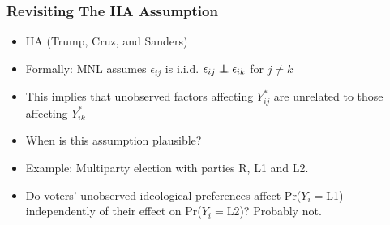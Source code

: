 \documentclass{beamer}
\newcommand\indep{\protect\mathpalette{\protect\independenT}{\perp}}
\def\independenT#1#2{\mathrel{\rlap{$#1#2$}\mkern2mu{#1#2}}}
\begin{document}

















\begin{frame}
\frametitle{Revisiting The IIA Assumption}
\begin{itemize}
  \item IIA (Trump, Cruz, and Sanders)
\medskip
\pause
  \item Formally: MNL assumes $\epsilon_{ij}$ is i.i.d.  $\epsilon_{ij} \indep \epsilon_{ik}$ for $j\neq k$
\medskip
\pause
  \item This implies that unobserved factors affecting $Y_{ij}^\ast$
    are unrelated to those affecting $Y_{ik}^\ast$
\medskip
\pause
  \item When is this assumption plausible?
\pause
\bigskip
  \item Example: Multiparty election with parties R, L1 and L2.
\medskip
\pause
  \item Do voters' unobserved ideological preferences affect Pr($Y_i=$L1) independently
    of their effect on Pr($Y_i=$L2)? \pause Probably not.
\end{itemize}
\end{frame}
\end{document}
